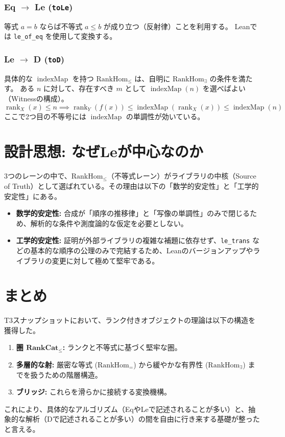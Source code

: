 \documentclass[a4paper,11pt]{article}
\theoremstyle{definition}
\theoremstyle{plain}
\newcommand{\code}[1]{\texttt{#1}}
\newcommand{\rank}{\operatorname{rank}}
\newcommand{\indexMap}{\operatorname{indexMap}}
\newcommand{\RankCatLe}{\mathbf{RankCat}_{\le}}
\newcommand{\RankHomLe}{\mathrm{RankHom}_{\le}}
\newcommand{\RankHomEq}{\mathrm{RankHom}_{=}}
\newcommand{\RankHomD}{\mathrm{RankHom}_{\exists}}
\begin{document}
\subsubsection*{Eq $\to$ Le (\code{toLe})}
等式 $a = b$ ならば不等式 $a \le b$ が成り立つ（反射律）ことを利用する。
Leanでは \code{le\_of\_eq} を使用して変換する。

\subsubsection*{Le $\to$ D (\code{toD})}
具体的な $\indexMap$ を持つ $\RankHomLe$ は、自明に $\RankHomD$ の条件を満たす。
ある $n$ に対して、存在すべき $m$ として $\indexMap(n)$ を選べばよい（Witnessの構成）。
\[ \rank_X(x) \le n \implies \rank_Y(f(x)) \le \indexMap(\rank_X(x)) \le \indexMap(n) \]
ここで2つ目の不等号には $\indexMap$ の単調性が効いている。

\section{設計思想: なぜLeが中心なのか}

3つのレーンの中で、$\RankHomLe$（不等式レーン）がライブラリの中核（Source of Truth）として選ばれている。その理由は以下の「数学的安定性」と「工学的安定性」にある。

\begin{itemize}
    \item \textbf{数学的安定性:} 合成が「順序の推移律」と「写像の単調性」のみで閉じるため、解析的な条件や測度論的な仮定を必要としない。
    \item \textbf{工学的安定性:} 証明が外部ライブラリの複雑な補題に依存せず、\code{le\_trans} などの基本的な順序の公理のみで完結するため、Leanのバージョンアップやライブラリの変更に対して極めて堅牢である。
\end{itemize}

\section{まとめ}

T3スナップショットにおいて、ランク付きオブジェクトの理論は以下の構造を獲得した。

\begin{enumerate}
    \item \textbf{圏 $\RankCatLe$:} ランクと不等式に基づく堅牢な圏。
    \item \textbf{多層的な射:} 厳密な等式 ($\RankHomEq$) から緩やかな有界性 ($\RankHomD$) までを扱うための階層構造。
    \item \textbf{ブリッジ:} これらを滑らかに接続する変換機構。
\end{enumerate}

これにより、具体的なアルゴリズム（EqやLeで記述されることが多い）と、抽象的な解析（Dで記述されることが多い）の間を自由に行き来する基礎が整ったと言える。
\end{document}
